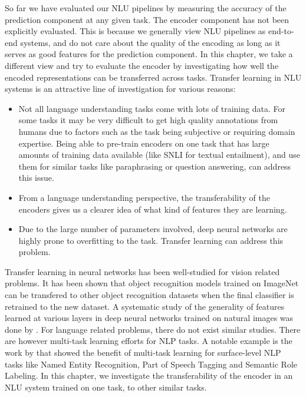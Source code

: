 So far we have evaluated our NLU pipelines by measuring the accuracy of the prediction component at any given task. The encoder component has not been explicitly evaluated.
This is because we generally view NLU pipelines as end-to-end systems, and do not care about the quality of the encoding as long as it serves as good features for the prediction
component. In this chapter, we take a different view and try to evaluate the encoder by investigating how well the encoded representations can be transferred across tasks. Transfer
learning in NLU systems is an attractive line of investigation for various reasons:
\begin{itemize}
 \item Not all language understanding tasks come with lots of training data. For some tasks it may be very difficult to get high quality annotations from humans due to factors such as 
 the task being subjective or requiring domain expertise. Being able to pre-train encoders on one task that has large amounts of training data available (like SNLI \cite{bowman:15} for textual entailment), and use them for similar
 tasks like paraphrasing or question answering, can address this issue.
 \item From a language understanding perspective, the transferability of the encoders gives us a clearer idea of what kind of features they are learning.
 \item Due to the large number of parameters involved, deep neural networks are highly prone to overfitting to the task. Transfer learning can address this problem. 
\end{itemize}

Transfer learning in neural networks has been well-studied for vision related problems. It has been shown \citep{zeiler2014visualizing} that object recognition models trained on
ImageNet \citep{deng2009imagenet} can be transfered to other object recognition datasets when the final classifier is retrained to the new dataset. A systematic study of the generality
of features learned at various layers in deep neural networks trained on natural images was done by \cite{yosinski2014transferable}. For language related problems, there do not exist similar studies.
There are however multi-task learning efforts for NLP tasks.  A notable example is the work by \cite{collobert2011natural} that showed the benefit of multi-task learning for surface-level NLP tasks 
like Named Entity Recognition, Part of Speech Tagging and Semantic Role Labeling. In this chapter, we investigate the transferability of the encoder in an NLU system trained on one task, to other similar tasks.

